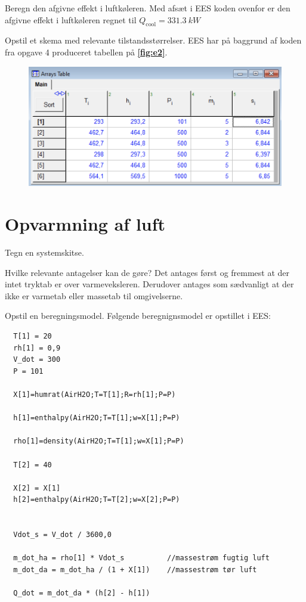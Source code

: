 \documentclass[a4paper]{article}
\begin{document}
 Beregn den afgivne effekt i luftkøleren.
\bigbreak
Med afsæt i EES koden ovenfor er den afgivne effekt i luftkøleren regnet til $Q_{\mathrm{cool}} = \qty{331,3}{kW}$

 Opstil et skema med relevante tilstandsstørrelser.
\bigbreak
EES har på baggrund af koden fra opgave 4 produceret tabellen på \textbf{\autoref{fig:e2}}.
\begin{figure} [ht]
  \centering
  \includegraphics[width=0.5\linewidth]{./figures/e2.png}
  \caption{}
  \label{fig:e2}
\end{figure}


\section{Opvarmning af luft}
 Tegn en systemskitse.
\bigbreak
\begin{figure}[ht]
  \centering
  \caption{}
  \label{fig:e3}
\end{figure}

 Hvilke relevante antagelser kan de gøre?
\bigbreak
Det antages først og fremmest at der intet tryktab er over varmeveksleren. Derudover antages som sædvanligt at der ikke er varmetab eller massetab til omgivelserne. 

 Opstil en beregningsmodel.
\bigbreak
Følgende beregnignsmodel er opstillet i EES:
\begin{verbatim}
  T[1] = 20
  rh[1] = 0,9
  V_dot = 300
  P = 101
   
  X[1]=humrat(AirH2O;T=T[1];R=rh[1];P=P)
   
  h[1]=enthalpy(AirH2O;T=T[1];w=X[1];P=P)
   
  rho[1]=density(AirH2O;T=T[1];w=X[1];P=P)
   
  T[2] = 40
   
  X[2] = X[1]
  h[2]=enthalpy(AirH2O;T=T[2];w=X[2];P=P)
   
   
  Vdot_s = V_dot / 3600,0
   
  m_dot_ha = rho[1] * Vdot_s          //massestrøm fugtig luft
  m_dot_da = m_dot_ha / (1 + X[1])    //massestrøm tør luft
   
  Q_dot = m_dot_da * (h[2] - h[1])
\end{verbatim}
\end{document}
